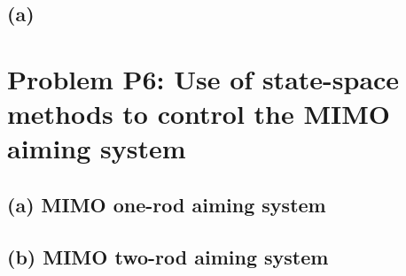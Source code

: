 \documentclass{tron}
\begin{document}
\subsection{(a) \label{ans:P5-a}}


\section{Problem P6: Use of state-space methods to control the MIMO aiming system}
\subsection{(a) MIMO one-rod aiming system \label{ans:P6-a}}

\subsection{(b) MIMO two-rod aiming system \label{ans:P6-b}}


\clearpage
\printglossaries


\end{document}
